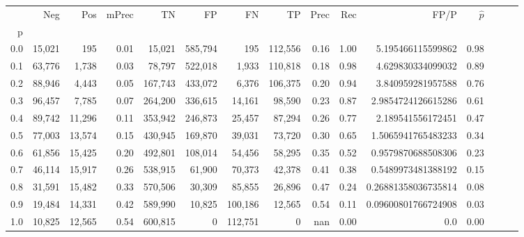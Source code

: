 \begin{tabular}{rrrrrrrrrrrrrrr}
\toprule
{} &     Neg &     Pos & mPrec &       TN &       FP &       FN &       TP &  Prec &   Rec &                 FP/P & $\hat{p}$ \\
p   &         &         &       &          &          &          &          &       &       &                      &           \\
\midrule
0.0 &  15,021 &     195 &  0.01 &   15,021 &  585,794 &      195 &  112,556 &  0.16 &  1.00 &    5.195466115599862 &      0.98 \\
0.1 &  63,776 &   1,738 &  0.03 &   78,797 &  522,018 &    1,933 &  110,818 &  0.18 &  0.98 &    4.629830334099032 &      0.89 \\
0.2 &  88,946 &   4,443 &  0.05 &  167,743 &  433,072 &    6,376 &  106,375 &  0.20 &  0.94 &    3.840959281957588 &      0.76 \\
0.3 &  96,457 &   7,785 &  0.07 &  264,200 &  336,615 &   14,161 &   98,590 &  0.23 &  0.87 &   2.9854724126615286 &      0.61 \\
0.4 &  89,742 &  11,296 &  0.11 &  353,942 &  246,873 &   25,457 &   87,294 &  0.26 &  0.77 &    2.189541556172451 &      0.47 \\
0.5 &  77,003 &  13,574 &  0.15 &  430,945 &  169,870 &   39,031 &   73,720 &  0.30 &  0.65 &   1.5065941765483233 &      0.34 \\
0.6 &  61,856 &  15,425 &  0.20 &  492,801 &  108,014 &   54,456 &   58,295 &  0.35 &  0.52 &   0.9579870688508306 &      0.23 \\
0.7 &  46,114 &  15,917 &  0.26 &  538,915 &   61,900 &   70,373 &   42,378 &  0.41 &  0.38 &   0.5489973481388192 &      0.15 \\
0.8 &  31,591 &  15,482 &  0.33 &  570,506 &   30,309 &   85,855 &   26,896 &  0.47 &  0.24 &  0.26881358036735814 &      0.08 \\
0.9 &  19,484 &  14,331 &  0.42 &  589,990 &   10,825 &  100,186 &   12,565 &  0.54 &  0.11 &  0.09600801766724908 &      0.03 \\
1.0 &  10,825 &  12,565 &  0.54 &  600,815 &        0 &  112,751 &        0 &   nan &  0.00 &                  0.0 &      0.00 \\
\bottomrule
\end{tabular}
